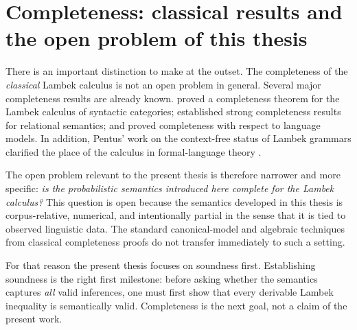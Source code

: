 \section{Completeness: classical results and the open problem of this thesis}
There is an important distinction to make at the outset. The completeness of the \emph{classical}
Lambek calculus is not an open problem in general. Several major completeness results are
already known. \citet{Dosen1985} proved a completeness theorem for the Lambek calculus of
syntactic categories; \citet{AndrekaMikulas1994} established strong completeness results for
relational semantics; and \citet{Pentus1995} proved completeness with respect to language
models. In addition, Pentus' work on the context-free status of Lambek grammars clarified the
place of the calculus in formal-language theory \citep{Pentus1993,Pentus1997}.

The open problem relevant to the present thesis is therefore narrower and more specific:
\emph{is the probabilistic semantics introduced here complete for the Lambek calculus?} This
question is open because the semantics developed in this thesis is corpus-relative, numerical,
and intentionally partial in the sense that it is tied to observed linguistic data. The standard
canonical-model and algebraic techniques from classical completeness proofs do not transfer
immediately to such a setting.

For that reason the present thesis focuses on soundness first. Establishing soundness is the right
first milestone: before asking whether the semantics captures \emph{all} valid inferences, one
must first show that every derivable Lambek inequality is semantically valid. Completeness is the
next goal, not a claim of the present work.

